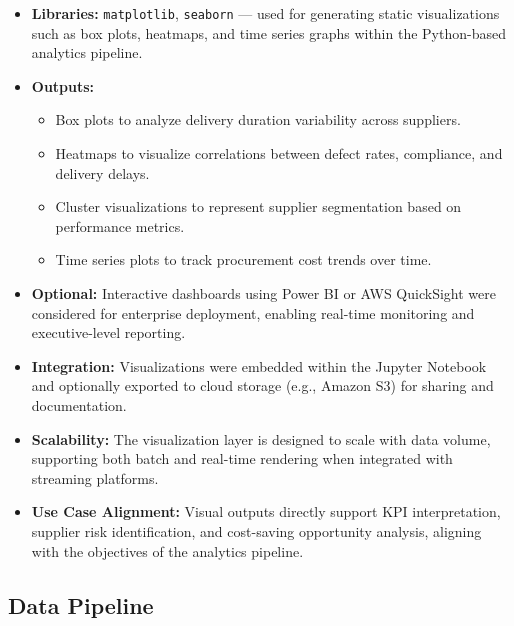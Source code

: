 \documentclass[10pt, twocolumn]{article}
\begin{document}
\begin{itemize}
    \item \textbf{Libraries:} \texttt{matplotlib}, \texttt{seaborn} — used for generating static visualizations such as box plots, heatmaps, and time series graphs within the Python-based analytics pipeline.
    \item \textbf{Outputs:} 
    \begin{itemize}
        \item Box plots to analyze delivery duration variability across suppliers.
        \item Heatmaps to visualize correlations between defect rates, compliance, and delivery delays.
        \item Cluster visualizations to represent supplier segmentation based on performance metrics.
        \item Time series plots to track procurement cost trends over time.
    \end{itemize}
    \item \textbf{Optional:} Interactive dashboards using Power BI or AWS QuickSight were considered for enterprise deployment, enabling real-time monitoring and executive-level reporting.
    \item \textbf{Integration:} Visualizations were embedded within the Jupyter Notebook and optionally exported to cloud storage (e.g., Amazon S3) for sharing and documentation.
    \item \textbf{Scalability:} The visualization layer is designed to scale with data volume, supporting both batch and real-time rendering when integrated with streaming platforms.
    \item \textbf{Use Case Alignment:} Visual outputs directly support KPI interpretation, supplier risk identification, and cost-saving opportunity analysis, aligning with the objectives of the analytics pipeline.
\end{itemize}


\subsection{Data Pipeline}
\end{document}
